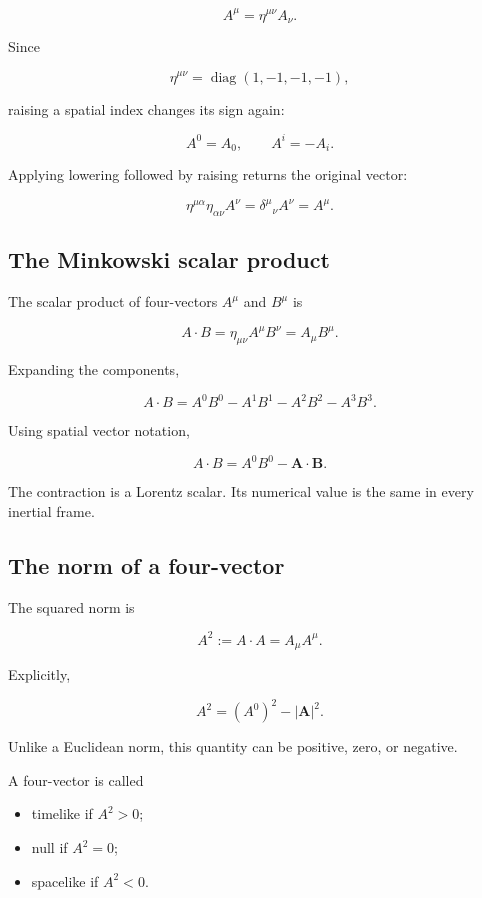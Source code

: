 \[
\boxed{
A^{\mu}
=
\eta^{\mu\nu}A_{\nu}
}.
\]

Since

\[
\eta^{\mu\nu}
=
\operatorname{diag}(1,-1,-1,-1),
\]

raising a spatial index changes its sign again:

\[
A^{0}=A_{0},
\qquad
A^{i}=-A_{i}.
\]

Applying lowering followed by raising returns the original vector:

\[
\eta^{\mu\alpha}\eta_{\alpha\nu}A^{\nu}
=
\delta^{\mu}{}_{\nu}A^{\nu}
=
A^{\mu}.
\]

\subsection{The Minkowski scalar product}

The scalar product of four-vectors \(A^{\mu}\) and \(B^{\mu}\) is

\[
\boxed{
A\cdot B
=
\eta_{\mu\nu}A^{\mu}B^{\nu}
=
A_{\mu}B^{\mu}
}.
\]

Expanding the components,

\[
\boxed{
A\cdot B
=
A^{0}B^{0}
-
A^{1}B^{1}
-
A^{2}B^{2}
-
A^{3}B^{3}
}.
\]

Using spatial vector notation,

\[
A\cdot B
=
A^{0}B^{0}
-
\mathbf{A}\cdot\mathbf{B}.
\]

The contraction is a Lorentz scalar. Its numerical value is the same in every inertial frame.

\subsection{The norm of a four-vector}

The squared norm is

\[
\boxed{
A^{2}
:=
A\cdot A
=
A_{\mu}A^{\mu}
}.
\]

Explicitly,

\[
A^{2}
=
(A^{0})^{2}
-
|\mathbf{A}|^{2}.
\]

Unlike a Euclidean norm, this quantity can be positive, zero, or negative.

A four-vector is called

\begin{itemize}
    \item timelike if \(A^{2}>0\);
    \item null if \(A^{2}=0\);
    \item spacelike if \(A^{2}<0\).
\end{itemize}

